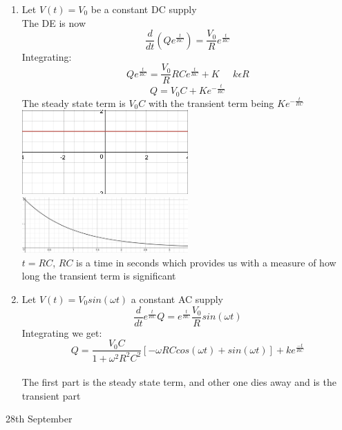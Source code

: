 \documentclass[11pt]{article}
\theoremstyle{definition}
\begin{document}
\begin{enumerate}
    \item Let $V(t) = V_0$ be a constant DC supply\\
    The DE is now
    $$\frac{d}{dt}(Qe^{\frac{t}{RC}}) = \frac{V_0}{R}e^{\frac{t}{RC}}$$
    Integrating:
    $$Qe^{\frac{t}{RC}} = \frac{V_0}{R}RCe^{\frac{t}{RC}} + K\;\;\;\;\;k \epsilon R$$
    $$Q = V_0C + Ke^{-\frac{t}{RC}}$$
    The steady state term is $V_0C$ with the transient term being $Ke^{-\frac{t}{RC}}$\\
    \includegraphics[width=0.5\textwidth]{constant.png}\\
    \includegraphics[width=0.5\textwidth]{etrc.png}\\
    $t = RC$, $RC$ is a time in seconds which provides us with a measure of how long the transient term is significant
    \item Let $V(t) = V_0sin(\omega t)$ a constant AC supply\\
    $$\frac{d}{dt}e^{\frac{t}{RC}}Q = e^{\frac{t}{RC}}\frac{V_0}{R}sin(\omega t)$$
    Integrating we get:
    $$Q = \frac{V_0C}{1+\omega^2R^2C^2} [-\omega RC cos(\omega t) + sin(\omega t)] + ke^{\frac{-t}{RC}}$$\\
    The first part is the steady state term, and other one dies away and is the transient part
\end{enumerate}
\newpage
\begin{center}
    {\LARGE 28th September}\\
\end{center}
\end{document}
